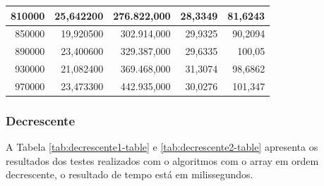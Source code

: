 \documentclass[a4paper, 12pt]{article}
\begin{document}
\begin{longtable}[c]{@{}rrrrr@{}}
	\multicolumn{1}{|r|}{810000}                  & \multicolumn{1}{r|}{25,642200}     & \multicolumn{1}{r|}{276.822,000}   & \multicolumn{1}{r|}{28,3349}       & \multicolumn{1}{r|}{81,6243}       \\* \midrule
	\multicolumn{1}{|r|}{850000}                  & \multicolumn{1}{r|}{19,920500}     & \multicolumn{1}{r|}{302.914,000}   & \multicolumn{1}{r|}{29,9325}       & \multicolumn{1}{r|}{90,2094}       \\* \midrule
	\multicolumn{1}{|r|}{890000}                  & \multicolumn{1}{r|}{23,400600}     & \multicolumn{1}{r|}{329.387,000}   & \multicolumn{1}{r|}{29,6335}       & \multicolumn{1}{r|}{100,05}        \\* \midrule
	\multicolumn{1}{|r|}{930000}                  & \multicolumn{1}{r|}{21,082400}     & \multicolumn{1}{r|}{369.468,000}   & \multicolumn{1}{r|}{31,3074}       & \multicolumn{1}{r|}{98,6862}       \\* \midrule
	\multicolumn{1}{|r|}{970000}                  & \multicolumn{1}{r|}{23,473300}     & \multicolumn{1}{r|}{442.935,000}   & \multicolumn{1}{r|}{30,0276}       & \multicolumn{1}{r|}{101,347}       \\* \bottomrule
\end{longtable}
\subsubsection{Decrescente}
A Tabela \ref{tab:decrescente1-table} e \ref{tab:decrescente2-table}  apresenta os resultados dos testes realizados com o algoritmos com o array em ordem decrescente, o resultado de tempo está em milissegundos.
\end{document}
